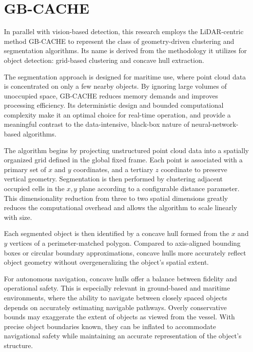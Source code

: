 \documentclass[../main.tex]{subfiles}
\begin{document}
\section{GB-CACHE} \label{gbcache}

In parallel with vision-based detection, this research employs the LiDAR-centric method GB-CACHE to represent the class of geometry-driven clustering and segmentation algorithms.
Its name is derived from the methodology it utilizes for object detection: grid-based clustering and concave hull extraction.

The segmentation approach is designed for maritime use, where point cloud data is concentrated on only a few nearby objects.
By ignoring large volumes of unoccupied space, GB-CACHE reduces memory demands and improves processing efficiency.
Its deterministic design and bounded computational complexity make it an optimal choice for real-time operation, and provide a meaningful contrast to the data-intensive, black-box nature of neural-network-based algorithms.

The algorithm begins by projecting unstructured point cloud data into a spatially organized grid defined in the global fixed frame.
Each point is associated with a primary set of $x$ and $y$ coordinates, and a tertiary $z$ coordinate to preserve vertical geometry.
Segmentation is then performed by clustering adjacent occupied cells in the $x,y$ plane according to a configurable distance parameter.
This dimensionality reduction from three to two spatial dimensions greatly reduces the computational overhead and allows the algorithm to scale linearly with size.


Each segmented object is then identified by a concave hull formed from the $x$ and $y$ vertices of a perimeter-matched polygon.
Compared to axis-aligned bounding boxes or circular boundary approximations, concave hulls more accurately reflect object geometry without overgeneralizing the object’s spatial extent.

For autonomous navigation, concave hulls offer a balance between fidelity and operational safety.
This is especially relevant in ground-based and maritime environments, where the ability to navigate between closely spaced objects depends on accurately estimating navigable pathways.
Overly conservative bounds may exaggerate the extent of objects as viewed from the vessel.
With precise object boundaries known, they can be inflated to accommodate navigational safety while maintaining an accurate representation of the object's structure.
\end{document}
